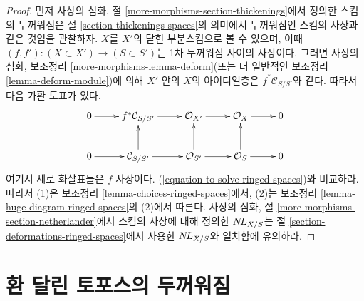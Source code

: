 \begin{proof}
먼저 사상의 심화, 절 \ref{more-morphisms-section-thickenings}에서 정의한
스킴의 두꺼워짐은 절 \ref{section-thickenings-spaces}의 의미에서
두꺼워짐인 스킴의 사상과 같은 것임을 관찰하자. $X$를 $X'$의
닫힌 부분스킴으로 볼 수 있으며, 이때
$(f, f') : (X \subset X') \to (S \subset S')$는 1차 두꺼워짐 사이의
사상이다. 그러면 사상의 심화, 보조정리
\ref{more-morphisms-lemma-deform}(또는 더 일반적인 보조정리
\ref{lemma-deform-module})에 의해 $X'$ 안의 $X$의 아이디얼층은
$f^*\mathcal{C}_{S/S'}$와 같다. 따라서 다음 가환 도표가 있다.
$$
\xymatrix{
0 \ar[r] & f^*\mathcal{C}_{S/S'} \ar[r] &
\mathcal{O}_{X'} \ar[r] &
\mathcal{O}_X \ar[r] & 0 \\
0 \ar[r] & \mathcal{C}_{S/S'} \ar[u] \ar[r] &
\mathcal{O}_{S'} \ar[u] \ar[r] &
\mathcal{O}_S \ar[u] \ar[r] & 0
}
$$
여기서 세로 화살표들은 $f$-사상이다.
(\ref{equation-to-solve-ringed-spaces})와 비교하라. 따라서 (1)은
보조정리 \ref{lemma-choices-ringed-spaces}에서, (2)는 보조정리
\ref{lemma-huge-diagram-ringed-spaces}의 (2)에서 따른다. 사상의 심화,
절 \ref{more-morphisms-section-netherlander}에서 스킴의 사상에 대해
정의한 $\mathop{N\!L}\nolimits_{X/S}$는 절 \ref{section-deformations-ringed-spaces}에서
사용한 $\mathop{N\!L}\nolimits_{X/S}$와 일치함에 유의하라.
\end{proof}










\section{환 달린 토포스의 두꺼워짐}
\label{section-thickenings-ringed-topoi}

